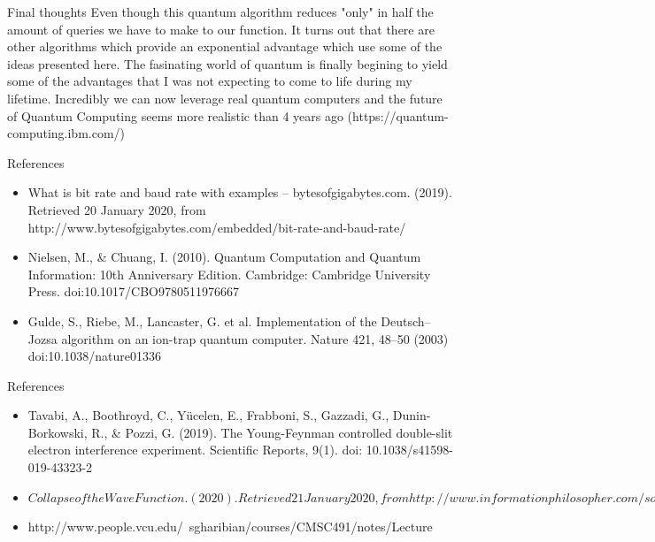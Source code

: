 \documentclass{beamer}
\begin{document}
\begin{frame}{Final thoughts}
	\justifying
	Even though this quantum algorithm reduces "only" in half the amount of queries we have to make to our function. It turns out that there are other algorithms which provide an exponential advantage which use some of the ideas presented here.
	\newline
	\newline
	The fasinating world of quantum is finally begining to yield some of the advantages that I was not expecting to come to life during my lifetime.
	\newline
	\newline
	Incredibly we can now leverage real quantum computers and the future of Quantum Computing seems more realistic than 4 years ago (https://quantum-computing.ibm.com/)
\end{frame}

\begin{frame}{References}
	\begin{itemize}
		\item What is bit rate and baud rate with examples – bytesofgigabytes.com. (2019). Retrieved 20 January 2020, from http://www.bytesofgigabytes.com/embedded/bit-rate-and-baud-rate/
		      \newline
		\item {Nielsen, M., \& Chuang, I. (2010). Quantum Computation and Quantum Information: 10th Anniversary Edition. Cambridge: Cambridge University Press. doi:10.1017/CBO9780511976667}
		      \newline
		\item {Gulde, S., Riebe, M., Lancaster, G. et al. Implementation of the Deutsch–Jozsa algorithm on an ion-trap quantum computer. Nature 421, 48–50 (2003) doi:10.1038/nature01336}
\end{itemize}
\end{frame}



\begin{frame}{References}
	\begin{itemize}
\item Tavabi, A., Boothroyd, C., Yücelen, E., Frabboni, S., Gazzadi, G., Dunin-Borkowski, R., \& Pozzi, G. (2019). The Young-Feynman controlled double-slit electron interference experiment. Scientific Reports, 9(1). doi: 10.1038/s41598-019-43323-2
\item $Collapse of the Wave Function. (2020). Retrieved 21 January 2020, from http://www.informationphilosopher.com/solutions/experiments/wave-function_collapse/$
\item http://www.people.vcu.edu/~sgharibian/courses/CMSC491/notes/Lecture%
\end{itemize}
\end{frame}
\end{document}
